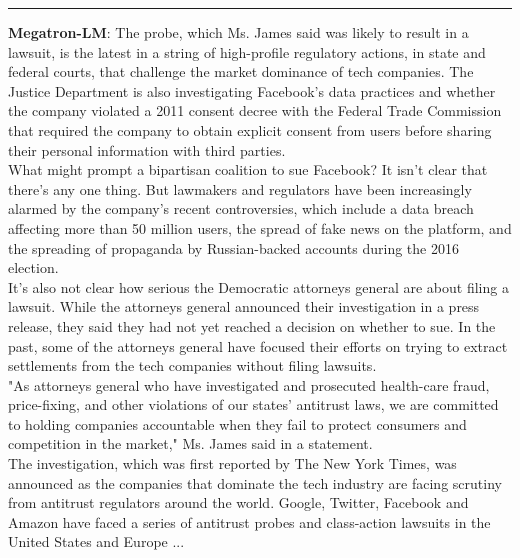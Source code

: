 \documentclass{article}
\begin{document}
{{\rule{0.48\textwidth}{0.4pt}
{\bf Megatron-LM}: The probe, which Ms. James said was likely to result in a lawsuit, is the latest in a string of high-profile regulatory actions, in state and federal courts, that challenge the market dominance of tech companies. The Justice Department is also investigating Facebook's data practices and whether the company violated a 2011 consent decree with the Federal Trade Commission that required the company to obtain explicit consent from users before sharing their personal information with third parties.
\\[1\baselineskip]
What might prompt a bipartisan coalition to sue Facebook? It isn't clear that there's any one thing. But lawmakers and regulators have been increasingly alarmed by the company's recent controversies, which include a data breach affecting more than 50 million users, the spread of fake news on the platform, and the spreading of propaganda by Russian-backed accounts during the 2016 election.
\\[1\baselineskip]
It's also not clear how serious the Democratic attorneys general are about filing a lawsuit. While the attorneys general announced their investigation in a press release, they said they had not yet reached a decision on whether to sue. In the past, some of the attorneys general have focused their efforts on trying to extract settlements from the tech companies without filing lawsuits.
\\[1\baselineskip]
"As attorneys general who have investigated and prosecuted health-care fraud, price-fixing, and other violations of our states' antitrust laws, we are committed to holding companies accountable when they fail to protect consumers and competition in the market," Ms. James said in a statement.
\\[1\baselineskip]
The investigation, which was first reported by The New York Times, was announced as the companies that dominate the tech industry are facing scrutiny from antitrust regulators around the world. Google, Twitter, Facebook and Amazon have faced a series of antitrust probes and class-action lawsuits in the United States and Europe ... 

}}
\end{document}
